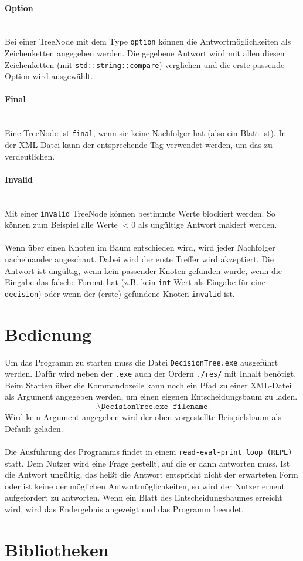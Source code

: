 \documentclass[a4paper,12pt]{article}
\newcommand{\myparagraph}[1]{\paragraph*{#1}\mbox{}\\}
\begin{document}
\myparagraph{Option}
Bei einer TreeNode mit dem Type \texttt{option} können die Antwortmöglichkeiten als Zeichenketten angegeben werden. Die gegebene Antwort wird mit allen diesen Zeichenketten (mit \texttt{std::string::compare}) verglichen und die erste passende Option wird ausgewählt.

\myparagraph{Final}
Eine TreeNode ist \texttt{final}, wenn sie keine Nachfolger hat (also ein Blatt ist). In der XML-Datei kann der entsprechende Tag verwendet werden, um das zu verdeutlichen.

\myparagraph{Invalid}
Mit einer \texttt{invalid} TreeNode können bestimmte Werte blockiert werden. So können zum Beispiel alle Werte $<0$ als ungültige Antwort makiert werden.
\\
\\
Wenn über einen Knoten im Baum entschieden wird, wird jeder Nachfolger nacheinander angeschaut. Dabei wird der erste Treffer wird akzeptiert. Die Antwort ist ungültig, wenn kein passender Knoten gefunden wurde, wenn die Eingabe das falsche Format hat (z.B. kein \texttt{int}-Wert als Eingabe für eine \texttt{decision}) oder wenn der (erste) gefundene Knoten \texttt{invalid} ist. 

\newpage
\section*{Bedienung}

Um das Programm zu starten muss die Datei \texttt{DecisionTree.exe} ausgeführt werden. Dafür wird neben der \texttt{.exe} auch der Ordern \texttt{./res/} mit Inhalt benötigt.
Beim Starten über die Kommandozeile kann noch ein Pfad zu einer XML-Datei als Argument angegeben werden, um einen eigenen Entscheidungsbaum zu laden. 
\[\texttt{.\textbackslash DecisionTree.exe [filename]}\]
Wird kein Argument angegeben wird der oben vorgestellte Beispielsbaum als Default geladen.
\\
\\
Die Ausführung des Programms findet in einem \texttt{read-eval-print loop (REPL)} statt. Dem Nutzer wird eine Frage gestellt, auf die er dann antworten muss. Ist die Antwort ungültig, das heißt die Antwort entspricht nicht der erwarteten Form oder ist keine der möglichen Antwortmöglichkeiten, so wird der Nutzer erneut aufgefordert zu antworten. 
Wenn ein Blatt des Entscheidungsbaumes erreicht wird, wird das Endergebnis angezeigt und das Programm beendet.

\section*{Bibliotheken}
\end{document}
